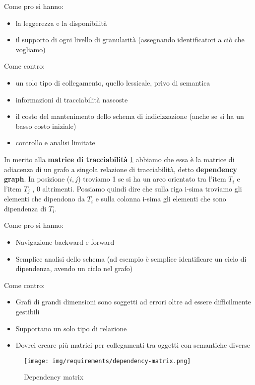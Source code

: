 Come pro si hanno:
\begin{itemize}
      \item la leggerezza e la disponibilità
      \item il supporto di ogni livello di granularità (assegnando identificatori
            a ciò che vogliamo)
\end{itemize}
Come contro:
\begin{itemize}
      \item un solo tipo di collegamento, quello lessicale, privo di semantica
      \item informazioni di tracciabilità nascoste
      \item il costo del mantenimento dello schema di indicizzazione (anche se si ha
            un basso costo iniziale)
      \item controllo e analisi limitate
\end{itemize}
In merito alla \textbf{matrice di tracciabilità} \ref{fig:dependency-matrix} abbiamo che essa è la matrice
di adiacenza di un grafo a singola relazione di tracciabilità, detto \textbf{dependency graph}.
In posizione ($i,j$) troviamo 1 se si ha un arco orientato tra l'item $T_i$ e
l'item $T_j$ , 0 altrimenti. Possiamo quindi dire che sulla riga i-sima troviamo
gli elementi che dipendono da $T_i$ e sulla colonna i-sima gli elementi che sono
dipendenza di $T_i$.

Come pro si hanno:
\begin{itemize}
      \item Navigazione backward e forward
      \item Semplice analisi dello schema (ad esempio è semplice identificare un
            ciclo di dipendenza, avendo un ciclo nel grafo)
\end{itemize}
Come contro:
\begin{itemize}
      \item Grafi di grandi dimensioni sono soggetti ad errori oltre ad essere
            difficilmente gestibili
      \item Supportano un solo tipo di relazione
      \item Dovrei creare più matrici per collegamenti tra oggetti con semantiche
            diverse
\end{itemize}

\begin{figure}[!ht]
      \centering
      \texttt{[image: img/requirements/dependency-matrix.png]}
      \caption{Dependency matrix}
      \label{fig:dependency-matrix}
\end{figure}

